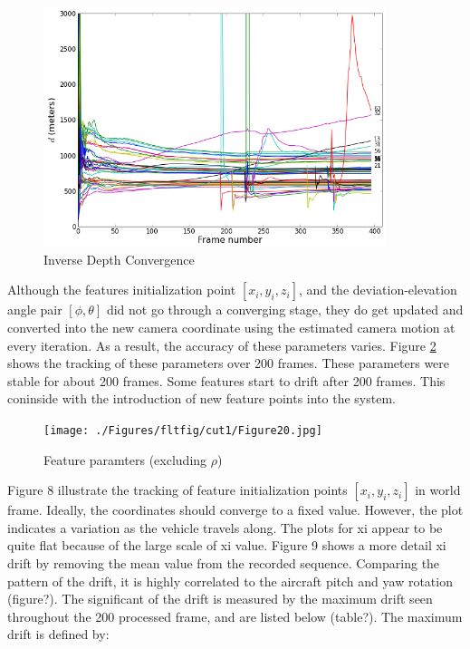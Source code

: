 \begin{figure}[h]
\centering
\includegraphics[width=10cm, keepaspectratio=true]
{./Figures/fltfig/cut1/Figure10.png}
\caption{Inverse Depth Convergence}
\label{fltfig:1}
\end{figure}

Although the features initialization point $[x_i, y_i, z_i]$, and the
deviation-elevation angle pair $[\phi, \theta]$ did not go through a
converging stage, they do get updated and converted into the new
camera coordinate using the estimated camera motion at every
iteration. As a result, the accuracy of these parameters varies.
Figure \ref{fltfig:2} shows the tracking of these parameters over 200
frames. These parameters were stable for about 200 frames. Some
features start to drift after 200 frames. This coninside with the
introduction of new feature points into the system. 
 
\begin{figure}[h]
\centering
\texttt{[image: ./Figures/fltfig/cut1/Figure20.jpg]}
\caption{Feature paramters (excluding $\rho$)}
\label{fltfig:2}
\end{figure}

Figure 8 illustrate the tracking of feature initialization 
points $[x_{i}, y_{i}, z_{i}]$ in world frame. Ideally, the 
coordinates should converge to a fixed value. However, the plot 
indicates a variation as the vehicle travels along. The plots for xi 
appear to be quite flat because of the large scale of xi value. Figure 9 
shows a more detail xi drift by removing the mean value from the 
recorded sequence. Comparing the pattern of the drift, it is highly 
correlated to the aircraft pitch and yaw rotation (figure?). The 
significant of the drift is measured by the maximum drift seen 
throughout the 200 processed frame, and are listed below (table?). The 
maximum drift is defined by:

